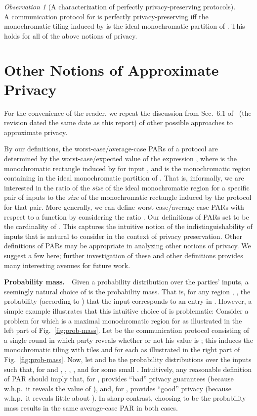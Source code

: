 \documentclass{article}
\theoremstyle{theorem}
\theoremstyle{definition}
\theoremstyle{remark}
\newtheorem{obs}[theorem]{Observation}
\begin{document}
\begin{obs}[A characterization of perfectly privacy-preserving protocols]\label{obs_privacy=maximal}
\ \\ A communication protocol  for  is perfectly privacy-preserving
iff the monochromatic til\-ing induced by  is the ideal
monochromatic partition of . This holds for all of the above
notions of privacy.
\end{obs}

\section{Other Notions of Approximate Privacy}\label{ap:alternate}

For the convenience of the reader, we repeat the discussion from Sec.~6.1 of~\cite{fjs09tr14} (the revision dated the same date as this report) of other possible approaches to approximate privacy.



By our definitions, the worst-case/average-case PARs of a protocol
are determined by the worst-case/expected value of the expression
, where  is the
monochromatic rectangle induced by  for input , and
 is the monochromatic region containing
 in the ideal monochromatic partition of .
That is, informally, we are interested in the ratio of the
\emph{size} of the ideal monochromatic region for a specific pair of inputs to the \emph{size} of the monochromatic rectangle induced by the protocol for that pair. More generally, we can define worst-case/average-case PARs with respect to a function  by considering the ratio
.  Our definitions of PARs set  to be the cardinality of .  This captures the intuitive notion of the
indistinguishability of inputs that is natural to consider in the
context of privacy preservation. Other definitions of PARs may be
appropriate in analyzing other notions of privacy.  We suggest a few here; further
investigation of these and other definitions provides many interesting avenues for future work.


\textbf{Probability mass.}\ \ Given a probability distribution  over the parties' inputs, a
seemingly natural choice of  is the probability mass. That is,
for any region , , the probability (according to
) that the input corresponds to an entry in . However, a 
simple example illustrates that this intuitive choice of
 is problematic: Consider a problem for which 
is a maximal monochromatic region for  as illustrated in the left part of Fig.~\ref{fig:prob-mass}.  Let  be the communication protocol consisting
of a single round in which party  reveals whether or not his value is ;
this induces the monochromatic tiling with tiles  and  for each  as illustrated in the right part of Fig.~\ref{fig:prob-mass}.  Now, let  and  be the probability distributions over the inputs  such that, for  and , , , , and  for some small .  
Intuitively, any
reasonable definition of PAR should imply that, for , 
provides ``bad'' privacy guarantees (because w.h.p.~it reveals the 
value of ), 
and, for ,  provides ``good''
privacy (because w.h.p.~it reveals little 
about ). 
In sharp contrast, choosing  to be the probability mass results
in the same average-case PAR in both cases.
\end{document}
